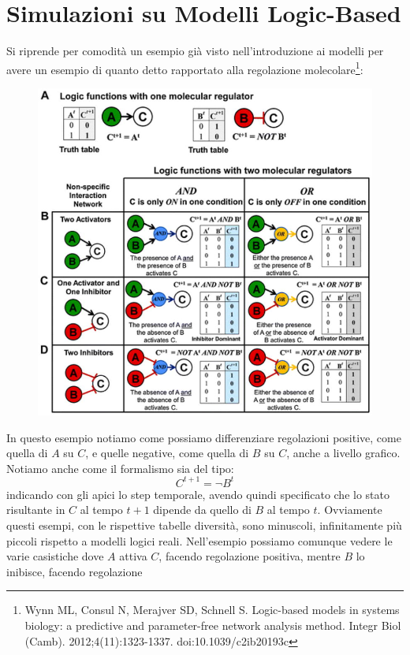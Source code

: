 \documentclass[a4paper,12pt, oneside]{book}
\begin{document}
\section{Simulazioni su Modelli Logic-Based}
Si riprende per comodità un esempio già visto nell'introduzione ai modelli per
avere un esempio di quanto detto rapportato alla regolazione
molecolare\footnote{Wynn ML, Consul N, Merajver SD, 
  Schnell S. Logic-based models in systems biology: a predictive and
  parameter-free network analysis method. Integr Biol
  (Camb). 2012;4(11):1323-1337. doi:10.1039/c2ib20193c}:
\begin{figure}[H]
  \centering
  \includegraphics[scale = 0.65]{img/logicnet.jpg}
\end{figure}
In questo esempio notiamo come possiamo differenziare regolazioni positive, come
quella di $A$ su $C$, e quelle negative, come quella di $B$ su $C$, anche a
livello grafico. Notiamo anche come il formalismo sia del tipo:
\[C^{t+1}=\neg B^t\]
indicando con gli apici lo step temporale, avendo quindi specificato che lo
stato risultante in $C$ al tempo $t+1$ dipende da quello di $B$ al tempo
$t$. Ovviamente questi esempi, con le rispettive tabelle diversità, sono
minuscoli, infinitamente più piccoli rispetto a modelli logici
reali. Nell'esempio possiamo comunque vedere le varie casistiche dove $A$ attiva
$C$, facendo regolazione positiva, mentre $B$ lo inibisce, facendo regolazione
\end{document}
